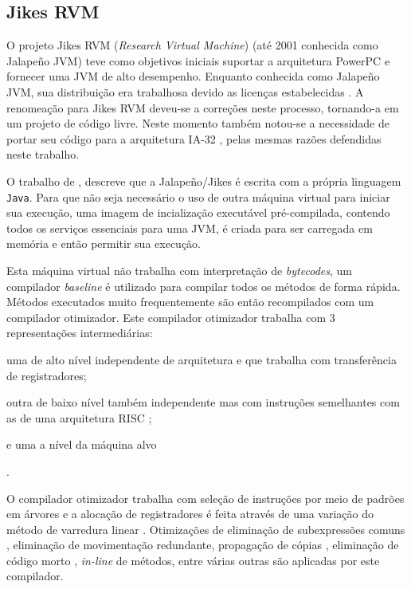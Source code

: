 \subsection{Jikes RVM}

O projeto Jikes RVM (\textit{Research Virtual Machine}) \cite{jikes}
(até 2001 conhecida como Jalapeño JVM) teve como objetivos iniciais
suportar a arquitetura PowerPC \cite{powerpc} e fornecer uma JVM de
alto desempenho. Enquanto conhecida como Jalapeño JVM, sua
distribuição era trabalhosa devido as licenças estabelecidas
\cite{jikesrvm2}. A renomeação para Jikes RVM deveu-se a correções
neste processo, tornando-a em um projeto de código livre. Neste momento
também notou-se a necessidade de portar seu código para a arquitetura
IA-32 \cite{jikesrvm2}, pelas mesmas razões defendidas neste trabalho.

O trabalho de , descreve que a Jalapeño/Jikes é
escrita com a própria linguagem
\texttt{Java}. Para que não seja necessário o uso de outra máquina
virtual para iniciar sua execução, uma imagem de incialização
executável pré-compilada, contendo todos os serviços essenciais para
uma JVM, é criada para ser carregada em memória e então permitir sua
execução.

Esta máquina virtual não trabalha com interpretação de
\textit{bytecodes}, um compilador \textit{baseline} é utilizado para
compilar todos os métodos de forma rápida. Métodos executados muito
frequentemente são então recompilados com um compilador otimizador.
Este compilador otimizador trabalha com 3 representações
intermediárias: \begin{inparaenum}[(1)]
\item uma de alto nível independente de arquitetura e que
trabalha com transferência de registradores; \item outra de
baixo nível também independente mas com instruções semelhantes com as
de uma arquitetura RISC \cite{risc}; \item e uma a nível da máquina
alvo\end{inparaenum}.

O compilador otimizador trabalha com seleção de instruções por meio de
padrões em árvores \cite{instrselect} e a
alocação de registradores é feita através de uma variação do método
de varredura linear \cite{linear_scan_regalloc}. Otimizações de
eliminação de subexpressões comuns \cite{muchnick}, eliminação de
movimentação redundante, propagação de cópias \cite{muchnick},
eliminação de código morto \cite{allen_kennedy}, \textit{in-line} de
métodos, entre várias outras são aplicadas por este compilador.

